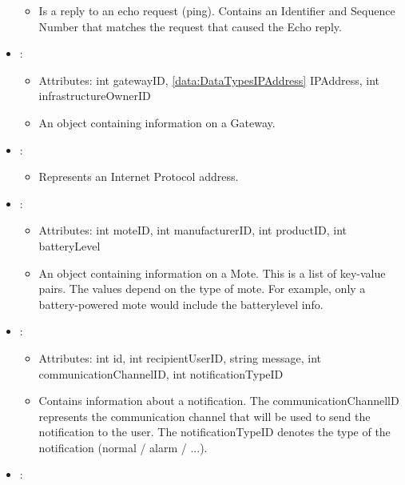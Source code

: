 \begin{itemize}[nolistsep,noitemsep]
\begin{itemize}[noitemsep,nolistsep]
\item[] Is a reply to an echo request (ping). Contains an Identifier and Sequence Number that matches the request that caused the Echo reply.
\end{itemize}
\item {}: 
\begin{itemize}[noitemsep,nolistsep]
\item[] Attributes: int gatewayID, \ref{data:DataTypesIPAddress} IPAddress, int infrastructureOwnerID
\item[] An object containing information on a Gateway.
\end{itemize}
\item {}: 
\begin{itemize}[noitemsep,nolistsep]

\item[] Represents an Internet Protocol address.
\end{itemize}
\item {}: 
\begin{itemize}[noitemsep,nolistsep]
\item[] Attributes: int moteID, int manufacturerID, int productID, int batteryLevel
\item[] An object containing information on a Mote. This is a list of key-value pairs. The values depend on the type of mote. For example, only a battery-powered mote would include the batterylevel info.
\end{itemize}
\item {}: 
\begin{itemize}[noitemsep,nolistsep]
\item[] Attributes: int id, int recipientUserID, string message, int communicationChannelID, int notificationTypeID
\item[] Contains information about a notification. The communicationChannellD represents the communication channel that will be used to send the notification to the user. The notificationTypeID denotes the type of the notification (normal / alarm / ...).
\end{itemize}
\item {}: 
\begin{itemize}


\end{itemize}
\end{itemize}
